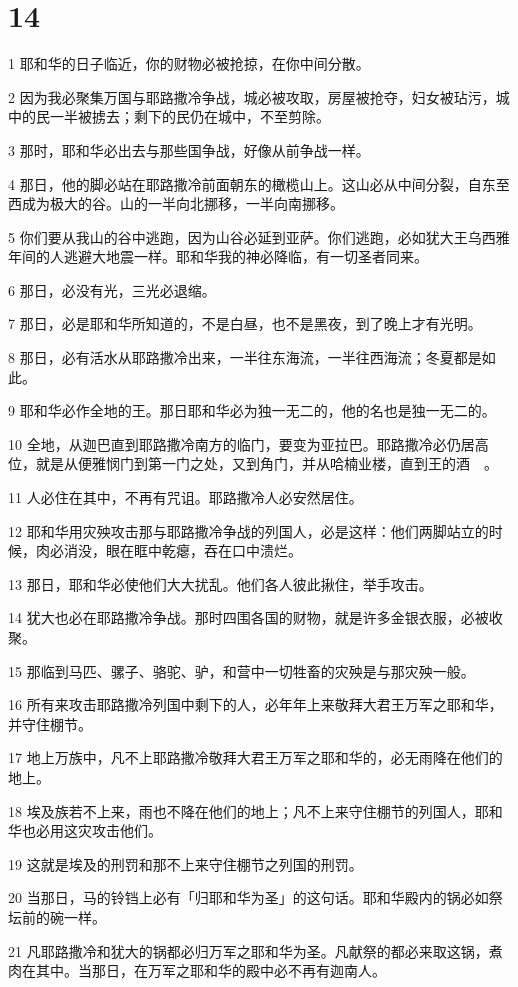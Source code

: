 \chapter{14}

\par 1 耶和华的日子临近，你的财物必被抢掠，在你中间分散。
\par 2 因为我必聚集万国与耶路撒冷争战，城必被攻取，房屋被抢夺，妇女被玷污，城中的民一半被掳去；剩下的民仍在城中，不至剪除。
\par 3 那时，耶和华必出去与那些国争战，好像从前争战一样。
\par 4 那日，他的脚必站在耶路撒冷前面朝东的橄榄山上。这山必从中间分裂，自东至西成为极大的谷。山的一半向北挪移，一半向南挪移。
\par 5 你们要从我山的谷中逃跑，因为山谷必延到亚萨。你们逃跑，必如犹大王乌西雅年间的人逃避大地震一样。耶和华我的神必降临，有一切圣者同来。
\par 6 那日，必没有光，三光必退缩。
\par 7 那日，必是耶和华所知道的，不是白昼，也不是黑夜，到了晚上才有光明。
\par 8 那日，必有活水从耶路撒冷出来，一半往东海流，一半往西海流；冬夏都是如此。
\par 9 耶和华必作全地的王。那日耶和华必为独一无二的，他的名也是独一无二的。
\par 10 全地，从迦巴直到耶路撒冷南方的临门，要变为亚拉巴。耶路撒冷必仍居高位，就是从便雅悯门到第一门之处，又到角门，并从哈楠业楼，直到王的酒　。
\par 11 人必住在其中，不再有咒诅。耶路撒冷人必安然居住。
\par 12 耶和华用灾殃攻击那与耶路撒冷争战的列国人，必是这样：他们两脚站立的时候，肉必消没，眼在眶中乾瘪，吞在口中溃烂。
\par 13 那日，耶和华必使他们大大扰乱。他们各人彼此揪住，举手攻击。
\par 14 犹大也必在耶路撒冷争战。那时四围各国的财物，就是许多金银衣服，必被收聚。
\par 15 那临到马匹、骡子、骆驼、驴，和营中一切牲畜的灾殃是与那灾殃一般。
\par 16 所有来攻击耶路撒冷列国中剩下的人，必年年上来敬拜大君王万军之耶和华，并守住棚节。
\par 17 地上万族中，凡不上耶路撒冷敬拜大君王万军之耶和华的，必无雨降在他们的地上。
\par 18 埃及族若不上来，雨也不降在他们的地上；凡不上来守住棚节的列国人，耶和华也必用这灾攻击他们。
\par 19 这就是埃及的刑罚和那不上来守住棚节之列国的刑罚。
\par 20 当那日，马的铃铛上必有「归耶和华为圣」的这句话。耶和华殿内的锅必如祭坛前的碗一样。
\par 21 凡耶路撒冷和犹大的锅都必归万军之耶和华为圣。凡献祭的都必来取这锅，煮肉在其中。当那日，在万军之耶和华的殿中必不再有迦南人。


